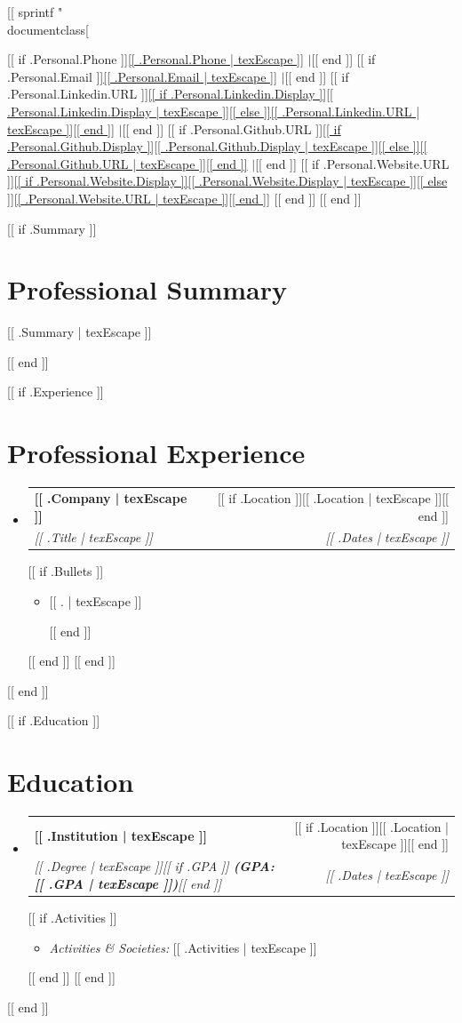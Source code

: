 [[ sprintf "\\documentclass[%
\makeatletter
\newcommand{\resumeItem}[1]{
  \item\small{#1 \vspace{-2pt}}
}
\newcommand{\resumeSubheading}[4]{
  \vspace{-1pt}\item
    \begin{tabular*}{0.97\textwidth}[t]{l@{\extracolsep{\fill}}r}
      \textbf{#1} & #2 \\
      \textit{\small#3} & \textit{\small #4} \\
    \end{tabular*}\vspace{-7pt}
}
\newcommand{\resumeSubHeadingListStart}{\begin{itemize}[leftmargin=0.15in, label={}]}
\newcommand{\resumeSubHeadingListEnd}{\end{itemize}}
\newcommand{\resumeItemListStart}{\begin{itemize}}
\newcommand{\resumeItemListEnd}{\end{itemize}\vspace{-5pt}}
\makeatother
\begin{document}
\begin{center}
    \small
    [[ if .Personal.Phone ]]\href{tel:[[ .Personal.Phone | texEscape ]]}{[[ .Personal.Phone | texEscape ]]} $|$[[ end ]]
    [[ if .Personal.Email ]]\href{mailto:[[ .Personal.Email | texEscape ]]}{[[ .Personal.Email | texEscape ]]} $|$[[ end ]]
    [[ if .Personal.Linkedin.URL ]]\href{[[ .Personal.Linkedin.URL | texEscape ]]}{[[ if .Personal.Linkedin.Display ]][[ .Personal.Linkedin.Display | texEscape ]][[ else ]][[ .Personal.Linkedin.URL | texEscape ]][[ end ]]} $|$[[ end ]]
    [[ if .Personal.Github.URL ]]\href{[[ .Personal.Github.URL | texEscape ]]}{[[ if .Personal.Github.Display ]][[ .Personal.Github.Display | texEscape ]][[ else ]][[ .Personal.Github.URL | texEscape ]][[ end ]]} $|$[[ end ]]
    [[ if .Personal.Website.URL ]]\href{[[ .Personal.Website.URL | texEscape ]]}{[[ if .Personal.Website.Display ]][[ .Personal.Website.Display | texEscape ]][[ else ]][[ .Personal.Website.URL | texEscape ]][[ end ]]} [[ end ]]
[[ end ]]
\end{center}
\vspace{-8pt}

[[ if .Summary ]]
\section{Professional Summary}
\vspace{2pt}
\begin{itemize}[leftmargin=0in, label={}]
    \small{\item{
    [[ .Summary | texEscape ]]
    }}
\end{itemize}
[[ end ]]

[[ if .Experience ]]
\section{Professional Experience}
  \resumeSubHeadingListStart
    [[ range .Experience ]]
    \resumeSubheading
      {[[ .Company | texEscape ]]}{[[ if .Location ]][[ .Location | texEscape ]][[ end ]]}
      {[[ .Title | texEscape ]]}{[[ .Dates | texEscape ]]}
      [[ if .Bullets ]]
      \resumeItemListStart
        [[ range texLines .Bullets ]]\resumeItem{[[ . | texEscape ]]}
        [[ end ]]
      \resumeItemListEnd
      [[ end ]]
    [[ end ]]
  \resumeSubHeadingListEnd
[[ end ]]

[[ if .Education ]]
\section{Education}
  \resumeSubHeadingListStart
    [[ range .Education ]]
    \resumeSubheading
      {[[ .Institution | texEscape ]]}{[[ if .Location ]][[ .Location | texEscape ]][[ end ]]}
      {[[ .Degree | texEscape ]][[ if .GPA ]] \textbf{(GPA: [[ .GPA | texEscape ]])}[[ end ]]}{[[ .Dates | texEscape ]]}
      [[ if .Activities ]]
      \resumeItemListStart
        \resumeItem{\textit{Activities \& Societies:} [[ .Activities | texEscape ]]}
      \resumeItemListEnd
      [[ end ]]
    [[ end ]]
  \resumeSubHeadingListEnd
[[ end ]]
\end{document}
